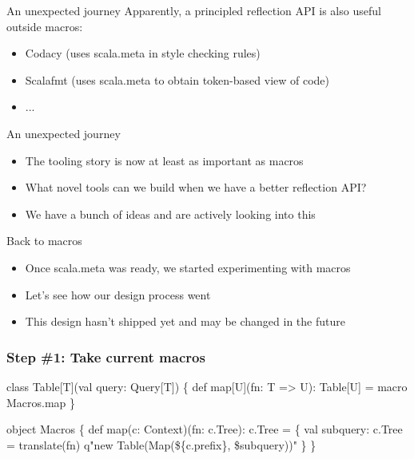 \documentclass[svgnames,dvipsnames,hyperref={bookmarks=false},usepdftitle=false]{beamer}
\begin{document}
\begin{frame}{An unexpected journey}
Apparently, a principled reflection API is also useful outside macros:
\begin{itemize}
\item Codacy (uses scala.meta in style checking rules)
\item Scalafmt (uses scala.meta to obtain token-based view of code)
\item ...
\end{itemize}
\end{frame}

\begin{frame}{An unexpected journey}
\begin{itemize}
\item The tooling story is now at least as important as macros
\item What novel tools can we build when we have a better reflection API?
\item We have a bunch of ideas and are actively looking into this
\end{itemize}
\end{frame}

\begin{frame}{Back to macros}
\begin{itemize}
\item Once scala.meta was ready, we started experimenting with macros
\item Let's see how our design process went
\item<2> \alert{This design hasn't shipped yet and may be changed in the future}
\end{itemize}
\end{frame}

\begin{frame}[fragile]
\frametitle{Step \#1: Take current macros}
\begin{semiverbatim}
class Table[T](val query: Query[T]) \{
  def map[U](fn: T => U): Table[U] = macro Macros.map
\}

object Macros \{
  def map(c: Context)(fn: c.Tree): c.Tree = \{
    val subquery: c.Tree = translate(fn)
    q"new Table(Map(\$\{c.prefix\}, \$subquery))"
  \}
\}
\end{semiverbatim}
\end{frame}
\end{document}
